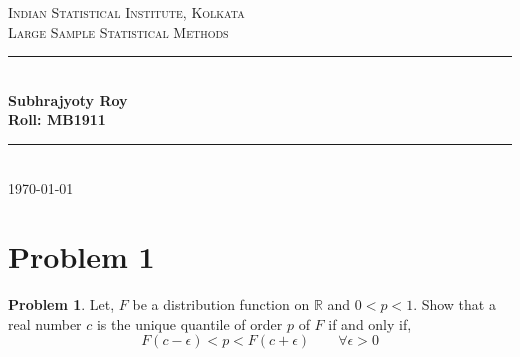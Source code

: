 \documentclass[12pt]{article}
\newcommand{\R}{\mathbb{R}}
\newcommand{\HRule}{\rule{\linewidth}{0.5mm}} %
\theoremstyle{definition}
\newtheorem*{prb}{Problem}
\newenvironment{problem}{
\begin{tcolorbox}[colback=blue!5!white,colframe=blue!75!black, parbox = true] \begin{prb}  }{\end{prb}\end{tcolorbox} }
\begin{document}
\begin{titlepage}
    
\centering
\textsc{\LARGE Indian Statistical Institute, Kolkata}\\[1.5cm] %
\textsc{\Large Large Sample Statistical Methods}\\[0.5cm] %

\HRule \\[0.4cm]
\large \textbf{Subhrajyoty Roy}\\
\large \textbf{Roll:  MB1911}\\
\HRule \\[1.5cm]
\normalsize \today

\end{titlepage}


\tableofcontents
\clearpage



\section{Problem 1}

\begin{problem}
	Let, $F$ be a distribution function on $\R$ and $0 < p < 1$. Show that a real number $c$ is the unique quantile of order $p$ of $F$ if and only if,
	$$F(c - \epsilon) < p < F(c + \epsilon) \qquad \forall \epsilon > 0$$
\end{problem}
\end{document}
